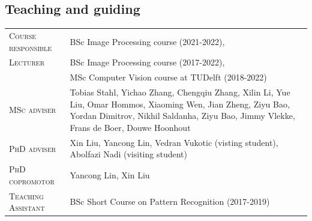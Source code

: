 \documentclass[a4paper, oneside, final]{scrartcl}
\begin{document}
\begin{center}
		\section{Teaching and guiding}
        \begin{tabular}{p{3.5cm}@{\hskip 0.3in}p{12.3cm}}
			\textsc{Course responsible}		    & BSc Image Processing course (2021-2022),\\
			\textsc{Lecturer}		            & BSc Image Processing course (2017-2022),\\
                                                & MSc Computer Vision course at TUDelft (2018-2022)\\
			\textsc{MSc adviser}                & Tobias Stahl, Yichao Zhang, Chengqiu Zhang, Xilin Li, Yue Liu, Omar Hommos, Xiaoming Wen, Jian Zheng, Ziyu Bao, Yordan Dimitrov, Nikhil Saldanha, Ziyu Bao, Jimmy Vlekke, Frans de Boer, Douwe Hoonhout\\
			\textsc{PhD adviser}                & Xin Liu, Yancong Lin, Vedran Vukotic (visting student), Abolfazi Nadi (visiting student)\\ 
			\textsc{PhD copromotor}             & Yancong Lin, Xin Liu\\ 
            \textsc{Teaching Assistant}         & BSc Short Course on Pattern Recognition (2017-2019)\\
		\end{tabular}

\end{center}
\end{document}
